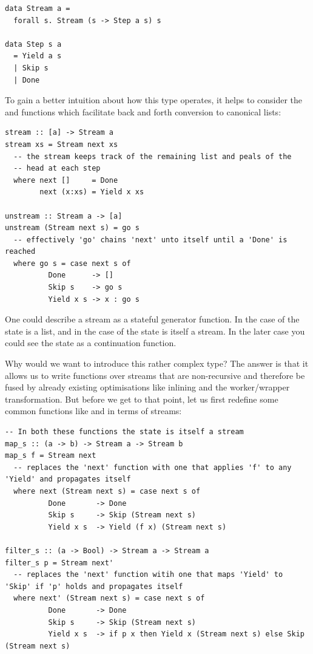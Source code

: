 \begin{listing}[H]
\begin{verbatim}
data Stream a = 
  forall s. Stream (s -> Step a s) s

data Step s a 
  = Yield a s 
  | Skip s 
  | Done
\end{verbatim}
\end{listing}

To gain a better intuition about how this type operates, it helps to consider the  and  functions which facilitate back and forth
conversion to canonical lists:

\begin{listing}[H]
\begin{verbatim}
stream :: [a] -> Stream a
stream xs = Stream next xs
  -- the stream keeps track of the remaining list and peals of the
  -- head at each step
  where next []     = Done
        next (x:xs) = Yield x xs

unstream :: Stream a -> [a]
unstream (Stream next s) = go s
  -- effectively 'go' chains 'next' unto itself until a 'Done' is reached
  where go s = case next s of
          Done      -> []
          Skip s    -> go s
          Yield x s -> x : go s
\end{verbatim}
\end{listing}

One could describe a stream as a stateful generator function. In the case of  the state is a list, 
and in the case of  the state is itself a stream. In the later case you could see the state as a continuation function.

Why would we want to introduce this rather complex type? The answer is that it allows us to write functions over streams that are
non-recursive and therefore be fused by already existing optimisations like inlining and the worker/wrapper transformation. But before
we get to that point, let us first redefine some common functions like  and  in terms of streams:

\begin{listing}[H]
\begin{verbatim}
-- In both these functions the state is itself a stream
map_s :: (a -> b) -> Stream a -> Stream b
map_s f = Stream next
  -- replaces the 'next' function with one that applies 'f' to any 'Yield' and propagates itself
  where next (Stream next s) = case next s of
          Done       -> Done
          Skip s     -> Skip (Stream next s)
          Yield x s  -> Yield (f x) (Stream next s)

filter_s :: (a -> Bool) -> Stream a -> Stream a
filter_s p = Stream next'
  -- replaces the 'next' function witih one that maps 'Yield' to 'Skip' if 'p' holds and propagates itself
  where next' (Stream next s) = case next s of
          Done       -> Done
          Skip s     -> Skip (Stream next s)
          Yield x s  -> if p x then Yield x (Stream next s) else Skip (Stream next s)
\end{verbatim}
\end{listing}

